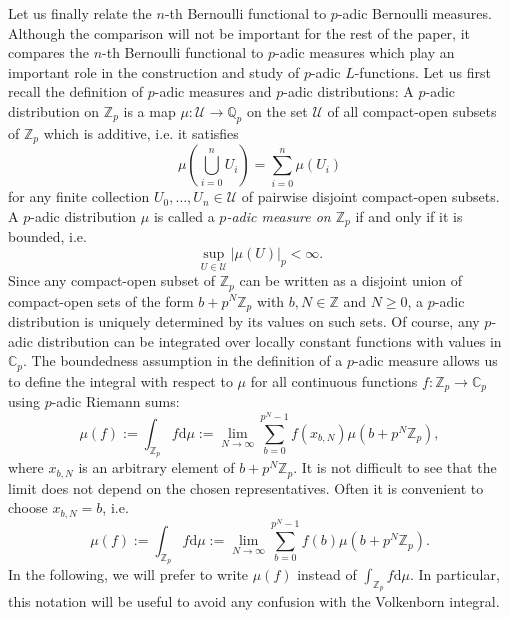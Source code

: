 \documentclass[12pt]{article}
\newtheorem{lemma}[theorem]{Lemma}
\numberwithin{equation}{section}
\begin{document}
Let us finally relate the $n$-th Bernoulli functional to $p$-adic Bernoulli measures. Although the comparison will not be important for the rest of the paper, it compares the $n$-th Bernoulli functional to $p$-adic measures which play an important role in the construction and study of $p$-adic $L$-functions. Let us first recall the definition of $p$-adic measures and $p$-adic distributions:
A $p$-adic distribution on $\mathbb{Z}_p$ is a map $\mu\colon \mathcal{U}\rightarrow \mathbb{Q}_p$ on the set $\mathcal{U}$ of all compact-open subsets of $\mathbb{Z}_p$ which is additive, i.e. it satisfies
\[
	\mu\left(\bigcup_{i=0}^n U_i\right )=\sum_{i=0}^n \mu(U_i)
\]
for any finite collection $U_0,\dots,U_n\in \mathcal{U}$ of pairwise disjoint compact-open subsets. A $p$-adic distribution $\mu$ is called a \emph{$p$-adic measure on $\mathbb{Z}_p$} if and only if it is bounded, i.e.
\[
	\sup_{U\in \mathcal{U}} |\mu(U)|_p<\infty.
\]
Since any compact-open subset of $\mathbb{Z}_p$ can be written as a disjoint union of compact-open sets of the form $b+p^N\mathbb{Z}_p$ with $b,N\in \mathbb{Z}$ and $N\geqslant 0$, a $p$-adic distribution is uniquely determined by its values on such sets. Of course, any $p$-adic distribution can be integrated over locally constant functions with values in $\mathbb{C}_p$. The boundedness assumption in the definition of a $p$-adic measure allows us to define the integral with respect to $\mu$ for all continuous functions $f\colon \mathbb{Z}_p\rightarrow \mathbb{C}_p$ using $p$-adic Riemann sums:
\[
	\mu(f):=\int_{\mathbb{Z}_p} f \mathrm{d}\mu:=\lim_{N\to \infty}  \sum_{b=0}^{p^N-1} f(x_{b,N}) \mu(b+p^N\mathbb{Z}_p),
\]
where $x_{b,N}$ is an arbitrary element of $b+p^N\mathbb{Z}_p$. It is not difficult to see that the limit does not depend on the chosen representatives. Often it is convenient to choose $x_{b,N}=b$, i.e.
\begin{equation}\label{eq:Riemann_sum}
	\mu(f):=\int_{\mathbb{Z}_p} f \mathrm{d}\mu:=\lim_{N\to \infty}  \sum_{b=0}^{p^N-1} f(b) \mu(b+p^N\mathbb{Z}_p).
\end{equation}
In the following, we will prefer to write $\mu(f)$ instead of $\int_{\mathbb{Z}_p} f \mathrm{d}\mu$. In particular, this notation will be useful to avoid any confusion with the Volkenborn integral. 
\end{document}
